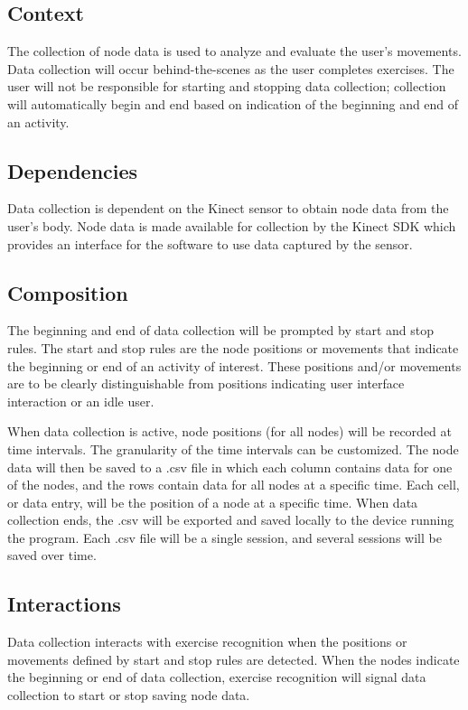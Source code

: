 \documentclass[onecolumn, draftclsnofoot,10pt, compsoc]{IEEEtran}
\begin{document}
\subsection{Context}
The collection of node data is used to analyze and evaluate the user's movements. Data collection will occur behind-the-scenes as the user completes exercises. The user will not be responsible for starting and stopping data collection; collection will automatically begin and end based on indication of the beginning and end of an activity.

\subsection{Dependencies}
Data collection is dependent on the Kinect sensor to obtain node data from the user's body. Node data is made available for collection by the Kinect SDK which provides an interface for the software to use data captured by the sensor\cite{KinectDevelop}.

\subsection{Composition}
The beginning and end of data collection will be prompted by start and stop rules. The start and stop rules are the node positions or movements that indicate the beginning or end of an activity of interest. These positions and/or movements are to be clearly distinguishable from positions indicating user interface interaction or an idle user. 

When data collection is active, node positions (for all nodes) will be recorded at time intervals. The granularity of the time intervals can be customized. The node data will then be saved to a .csv file in which each column contains data for one of the nodes, and the rows contain data for all nodes at a specific time. Each cell, or data entry, will be the position of a node at a specific time. When data collection ends, the .csv will be exported and saved locally to the device running the program. Each .csv file will be a single session, and several sessions will be saved over time.

\subsection{Interactions}
Data collection interacts with exercise recognition when the positions or movements defined by start and stop rules are detected. When the nodes indicate the beginning or end of data collection, exercise recognition will signal data collection to start or stop saving node data.
\end{document}
